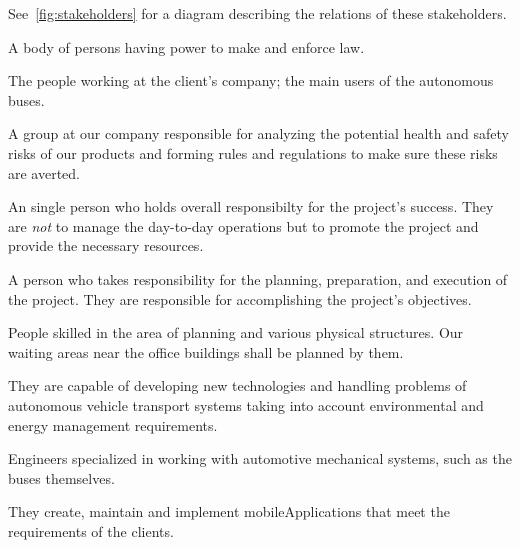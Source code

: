 \documentclass[a4paper]{article}
\begin{document}
See~\cref{fig:stakeholders} for a diagram describing the relations of these
\gls{stakeholder}s.

\begin{description}[style=multiline,align=right,leftmargin=6cm]
	\item[authorities]
		A body of persons having power to make and enforce law.

	\item[office workers]
		The people working at the client's company; the main users of
		the \gls{autonomous} buses.

	\item[Health\&Safety Department]
		A group at our company responsible for analyzing the
		potential health and safety risks of our products and
		forming rules and regulations to make sure these risks
		are averted.

	\item[project sponsor]
		An single person who holds overall responsibilty for the
		project's success. They are \emph{not} to manage the day-to-day
		operations but to promote the project and provide the necessary
		resources.

	\item[project manager]
		A person who takes responsibility for the planning, preparation,
		and execution of the project. They are responsible for
		accomplishing the project's objectives.

	\item[architects]
		People skilled in the area of planning and various physical
		structures. Our waiting areas near the office buildings shall be
		planned by them.

	\item[\gls{autonomous} \gls{vehicle} control engineers]
		They are capable of developing new technologies and handling
		problems of \gls{autonomous} \gls{vehicle} transport systems
		taking into account environmental and energy management
		requirements.

	\item[mechanical engineers]
		Engineers specialized in working with automotive mechanical
		systems, such as the buses themselves.

	\item[\gls{mobileApplication} developers]
		They create, maintain and implement \gls{mobileApplication}s
		that meet the requirements of the clients.

	\item[\gls{terminal} developers]


\end{description}
\end{document}
